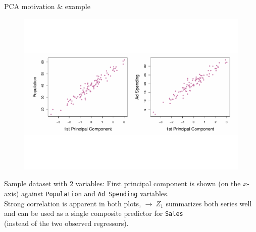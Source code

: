 \documentclass{beamer}
\begin{document}
\begin{frame}{PCA motivation \& example}
\vspace{-2.2cm}
\begin{figure}
\includegraphics[scale=0.40]{IMG/PCAExample3.pdf}
\end{figure}
\vspace{-2cm}
\centering Sample dataset with 2 variables: First principal component is shown (on the $x$-axis) against \texttt{Population} and \texttt{Ad Spending} variables. \\Strong correlation is apparent in both plots, $ \rightarrow ~Z_1$ summarizes both series well and can be used as a single composite predictor for \texttt{Sales} \\(instead of the two observed regressors).
\end{frame}
\end{document}
